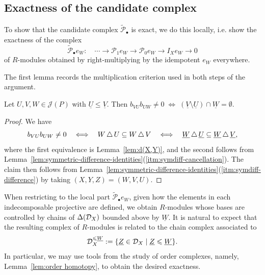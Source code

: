 \documentclass[a4paper,leqno]{amsart}
\begin{document}
\subsection{Exactness of the candidate complex}
To show that the candidate complex $\widetilde{\mathcal{P}}_\bullet$ is exact, we do this locally, i.e. show the exactness of the complex 
\begin{equation*}
 \widetilde{\mathcal P}_\bullet e_W:\quad
 \cdots\longrightarrow\mathcal P_1e_W
 \longrightarrow\mathcal P_0e_W
 \longrightarrow I_Xe_W\longrightarrow 0
\end{equation*}
of $R$-modules obtained by right-multiplying by the idempotent $e_W$ everywhere.

The first lemma records the multiplication criterion used in both steps of the argument.

\begin{lem}\label{lem:multiplication-criterion}
Let $U,V,W\in\mathcal J(P)$ with $\underline{U}\leq \underline{V}$.  Then $b_{VU}b_{UW}\neq0 \; \Leftrightarrow\; (\underline{V}\setminus \underline{U})\cap \underline{W}=\emptyset$.
\end{lem}

\begin{proof}We have
\[
 b_{VU}b_{UW}\neq0
 \quad\Longleftrightarrow\quad W\,{\mathbin{\triangle}}\, U\subseteq W\,{\mathbin{\triangle}}\, V
 \quad\Longleftrightarrow\quad
 \underline{W}\,{\mathbin{\triangle}}\,\underline{U}\subseteq\underline{W}\,{\mathbin{\triangle}}\,\underline{V},
\]
where the first equivalence is Lemma~\ref{lem:d(X,Y)}, and the second follows from Lemma~\ref{lem:symmetric-difference-identities}\textup{(\ref{itm:symdiff-cancellation})}. The claim then follows from Lemma~\ref{lem:symmetric-difference-identities}\textup{(\ref{itm:symdiff-difference})} by taking $(X,Y,Z)=(W,V,U)$.
\end{proof}


When restricting to the local part $\widetilde{\mathcal P}_\bullet e_W$, given how the elements in each indecomposable projective are defined, we obtain $R$-modules whose bases are controlled by chains of $\Delta(\mathcal D_X)$ bounded above by $\underline{W}$.
It is natural to expect that the resulting complex of $R$-modules is related to the chain complex associated to $$\mathcal D_X^{\leqslant \underline{W}} := \{\underline{Z}\in\mathcal D_X\mid \underline{Z}\leqslant \underline{W}\}.$$  
In particular, we may use tools from the study of order complexes, namely, Lemma~\ref{lem:order homotopy}, to obtain the desired exactness.
\end{document}
